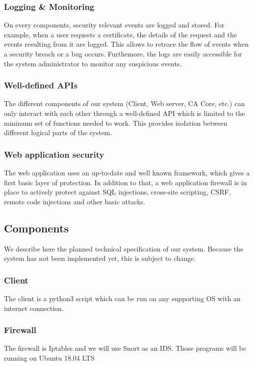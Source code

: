 \documentclass[english]{article}
\begin{document}
\subsubsection{Logging \& Monitoring}
On every components, security relevant events are logged and stored. For example, when a user requests a certificate, the details of the request and the events resulting from it are logged. This allows to retrace the flow of events when a security breach or a bug occurs. Furthemore, the logs are easily accessible for the system administrator to monitor any suspicious events.
\subsubsection{Well-defined APIs}
The different components of our system (Client, Web server, CA Core, etc.) can only interact with each other through a well-defined API which is limited to the minimum set of functions needed to work. This provides isolation between different logical parts of the system.
\subsubsection{Web application security}
The web application uses an up-to-date and well known framework, which gives a first basic layer of protection. In addition to that, a web application firewall is in place to actively protect against SQL injections, cross-site scripting, CSRF, remote code injections and other basic attacks.
\subsection{Components}\label{ssec:components}
We describe here the planned technical specification of our system. Because the system has not been implemented yet, this is subject to change.
\subsubsection{Client}
The client is a python3 script which can be run on any supporting OS with an internet connection.
\subsubsection{Firewall}
The firewall is Iptables and we will use Snort as an IDS. Those programs will be running on Ubuntu 18.04 LTS
\end{document}
